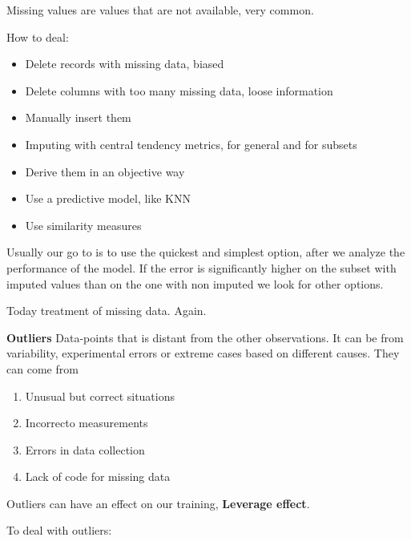 \vspace{10pt}

Missing values are values that are not available, very common. 

How to deal:
\begin{itemize}
    \item Delete records with missing data, biased
    \item Delete columns with too many missing data, loose information
    \item Manually insert them
    \item Imputing with central tendency metrics, for general and for subsets
    \item Derive them in an objective way
    \item Use a predictive model, like KNN
    \item Use similarity measures
\end{itemize}

\vspace{10pt}

Usually our go to is to use the quickest and simplest option, after we analyze the performance of the model.
If the error is significantly higher on the subset with imputed values than on the one with non imputed we look for other options.



Today treatment of missing data. Again.

\vspace{10pt}

\textbf{Outliers} \ra Data-points that is distant from the other observations.
It can be from variability, experimental errors or extreme cases based on different causes. 
They can come from
\begin{enumerate}
    \item Unusual but correct situations
    \item Incorrecto measurements
    \item Errors in data collection
    \item Lack of code for missing data
\end{enumerate}

Outliers can have an effect on our training, \textbf{Leverage effect}.



To deal with outliers:

